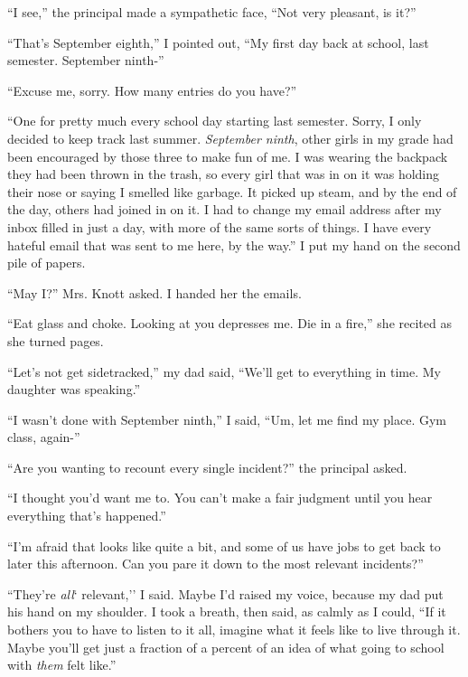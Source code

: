 ``I see,'' the principal made a sympathetic face, ``Not very pleasant, is it?''



``That's September eighth,'' I pointed out, ``My first day back at school, last semester.  September ninth-''



``Excuse me, sorry.  How many entries do you have?''



``One for pretty much every school day starting last semester.  Sorry, I only decided to keep track last summer.  \emph{September ninth}, other girls in my grade had been encouraged by those three to make fun of me.  I was wearing the backpack they had been thrown in the trash, so every girl that was in on it was holding their nose or saying I smelled like garbage.  It picked up steam, and by the end of the day, others had joined in on it.  I had to change my email address after my inbox filled in just a day, with more of the same sorts of things.  I have every hateful email that was sent to me here, by the way.''  I put my hand on the second pile of papers.



``May I?'' Mrs. Knott asked.  I handed her the emails.



``Eat glass and choke.  Looking at you depresses me.  Die in a fire,'' she recited as she turned pages.



``Let's not get sidetracked,'' my dad said, ``We'll get to everything in time.  My daughter was speaking.''



``I wasn't done with September ninth,'' I said, ``Um, let me find my place.  Gym class, again-''



``Are you wanting to recount every single incident?'' the principal asked.



``I thought you'd want me to.  You can't make a fair judgment until you hear everything that's happened.''



``I'm afraid that looks like quite a bit, and some of us have jobs to get back to later this afternoon.  Can you pare it down to the most relevant incidents?''



``They're \emph{all}` relevant,'' I said.  Maybe I'd raised my voice, because my dad put his hand on my shoulder.  I took a breath, then said, as calmly as I could, ``If it bothers you to have to listen to it all, imagine what it feels like to live through it.  Maybe you'll get just a fraction of a percent of an idea of what going to school with \emph{them} felt like.''




